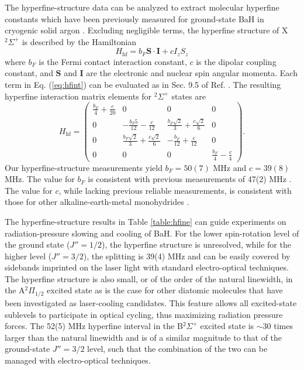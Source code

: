 \documentclass[amsmath,amssymb,aps,twocolumn,longbibliography,notitlepage]{revtex4-1}
\begin{document}
The hyperfine-structure data can be analyzed to extract molecular hyperfine constants which have been previously measured for ground-state BaH in cryogenic solid argon \cite{WeltnerKnightJCP71_AlkalineEarthHydridesHyperfine}.  Excluding negligible terms, the hyperfine structure of X$^2\Sigma^+$ is described by the Hamiltonian
\begin{equation}
H_{\mathrm{hf}} = b_F \mathbf{S}\cdot\mathbf{I} + c I_z S_z
\label{eq:hfint}
\end{equation}
where $b_F$ is the Fermi contact interaction constant, $c$ is the dipolar coupling constant, and $\mathbf{S}$ and $\mathbf{I}$ are the electronic and nuclear spin angular momenta.
Each term in Eq. (\ref{eq:hfint}) can be evaluated as in Sec. 9.5 of Ref. \cite{BrownCarrington}.
The resulting hyperfine interaction matrix elements for $^2\Sigma^+$ states are
\begin{equation}
H_{\mathrm{hf}} =
 \begin{pmatrix}
 \frac{b_F}{4} + \frac{c}{20} & 0 & 0 & 0 \\
 0 & -\frac{b_F5}{12} -\frac{c}{12} & \frac{b_F\sqrt{2}}{3} + \frac{c\sqrt{2}}{6} & 0 \\
 0  & \frac{b_F\sqrt{2}}{3} + \frac{c\sqrt{2}}{6} & -\frac{b_F}{12} +\frac{c}{12} & 0  \\
 0 & 0 & 0 & \frac{b_F}{4} - \frac{c}{4}
 \end{pmatrix}.
 \nonumber
\end{equation}
Our hyperfine-structure measurements yield $b_F = 50(7)$ MHz and $c = 39(8)$ MHz.  The value for $b_F$ is consistent with previous measurements of 47(2) MHz \cite{WeltnerKnightJCP71_AlkalineEarthHydridesHyperfine}.  The value for $c$, while lacking previous reliable measurements, is consistent with those for other alkaline-earth-metal monohydrides \cite{WeltnerKnightJCP71_AlkalineEarthHydridesHyperfine}.

The hyperfine-structure results in Table \ref{table:hfine} can guide experiments on radiation-pressure slowing and cooling of BaH.  For the lower spin-rotation level of the ground state ($J''=1/2$), the hyperfine structure is unresolved, while for the higher level ($J''=3/2$), the splitting is 39(4) MHz and can be easily covered by sidebands imprinted on the laser light with standard electro-optical techniques.  The hyperfine structure is also small, or of the order of the natural linewidth, in the A$^2\Pi_{1/2}$ excited state as is the case for other diatomic molecules that have been investigated as laser-cooling candidates.  This feature allows all excited-state sublevels to participate in optical cycling, thus maximizing radiation pressure forces.  The 52(5) MHz hyperfine interval in the B$^2\Sigma^+$ excited state is $\sim30$ times larger than the natural linewidth and is of a similar magnitude to that of the ground-state $J''=3/2$ level, such that the combination of the two can be managed with electro-optical techniques.
\end{document}
